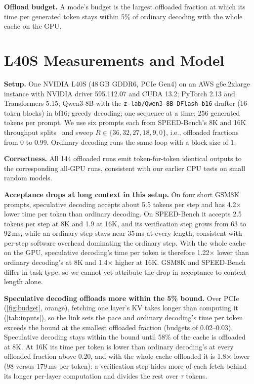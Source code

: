 \documentclass{article}
\begin{document}
\textbf{Offload budget.} A mode's budget is the largest offloaded fraction at which its time per generated token stays within 5\% of ordinary decoding with the whole cache on the GPU.

\section{L40S Measurements and Model}
\label{sec:eval}

\textbf{Setup.} One NVIDIA L40S (48\,GB GDDR6, PCIe Gen4) on an AWS g6e.2xlarge instance with NVIDIA driver 595.112.07 and CUDA 13.2; PyTorch 2.13 and Transformers 5.15; Qwen3-8B with the \texttt{z-lab/\allowbreak Qwen3-8B-\allowbreak DFlash-b16} drafter (16-token blocks) in bf16; greedy decoding; one sequence at a time; 256 generated tokens per prompt. We use six prompts each from SPEED-Bench's 8K and 16K throughput splits~\citep{abramovich2026speedbench} and sweep $R \in \{36, 32, 27, 18, 9, 0\}$, i.e., offloaded fractions from 0 to 0.99. Ordinary decoding runs the same loop with a block size of 1.

\textbf{Correctness.} All 144 offloaded runs emit token-for-token identical outputs to the corresponding all-GPU runs, consistent with our earlier CPU tests on small random models.

\textbf{Acceptance drops at long context in this setup.} On four short GSM8K prompts, speculative decoding accepts about 5.5 tokens per step and has 4.2$\times$ lower time per token than ordinary decoding. On SPEED-Bench it accepts 2.5 tokens per step at 8K and 1.9 at 16K, and its verification step grows from 63 to 92\,ms, while an ordinary step stays near 35\,ms at every length, consistent with per-step software overhead dominating the ordinary step. With the whole cache on the GPU, speculative decoding's time per token is therefore 1.22$\times$ lower than ordinary decoding's at 8K and 1.4$\times$ higher at 16K. GSM8K and SPEED-Bench differ in task type, so we cannot yet attribute the drop in acceptance to context length alone.

\textbf{Speculative decoding offloads more within the 5\% bound.} Over PCIe (\cref{fig:budget}, orange), fetching one layer's KV takes longer than computing it (\cref{tab:inputs}), so the link sets the pace and ordinary decoding's time per token exceeds the bound at the smallest offloaded fraction (budgets of 0.02--0.03). Speculative decoding stays within the bound until 58\% of the cache is offloaded at 8K. At 16K its time per token is lower than ordinary decoding's at every offloaded fraction above 0.20, and with the whole cache offloaded it is 1.8$\times$ lower (98 versus 179\,ms per token): a verification step hides more of each fetch behind its longer per-layer computation and divides the rest over $\tau$ tokens.
\end{document}

